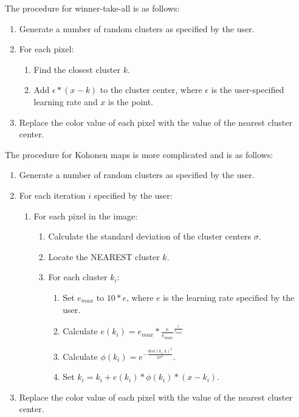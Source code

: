 \documentclass[letter,11pt,titlepage]{article}
\begin{document}
The procedure for winner-take-all is as follows\cite{Class}:
\begin{enumerate}
    \item Generate a number of random clusters as specified by the user.
    \item For each pixel:
        \begin{enumerate}
            \item Find the closest cluster \(k\).
            \item Add \(\epsilon * (x - k)\) to the cluster center, where \(\epsilon\) is the user-specified learning rate and \(x\) is the point.
        \end{enumerate}
    \item Replace the color value of each pixel with the value of the nearest cluster center.
\end{enumerate}

The procedure for Kohonen maps is more complicated and is as follows\cite{Class}:
\begin{enumerate}
    \item Generate a number of random clusters as specified by the user.
    \item For each iteration \(i\) specified by the user:
        \begin{enumerate}
            \item For each pixel in the image:
                \begin{enumerate}
                    \item Calculate the standard deviation of the cluster centers \(\sigma\).
                    \item Locate the NEAREST cluster \(k\).
                    \item For each cluster \(k_i\):
                        \begin{enumerate}
                            \item Set \(e_{max}\) to \(10 * e\), where \(e\) is the learning rate specified by the user.
                            \item Calculate \(e(k_i) = e_{max} * \frac{e}{e_{max}}^\frac{i}{i_{max}}\)
                            \item Calculate \(\phi(k_i) = e^{-\frac{dist(k_i, k)^2}{2\sigma^2}}\).
                            \item Set \(k_i = k_i + e(k_i) * \phi(k_i) * (x - k_i)\).
                        \end{enumerate}
                \end{enumerate}
        \end{enumerate}
    \item Replace the color value of each pixel with the value of the nearest cluster center.
\end{enumerate}
\end{document}
